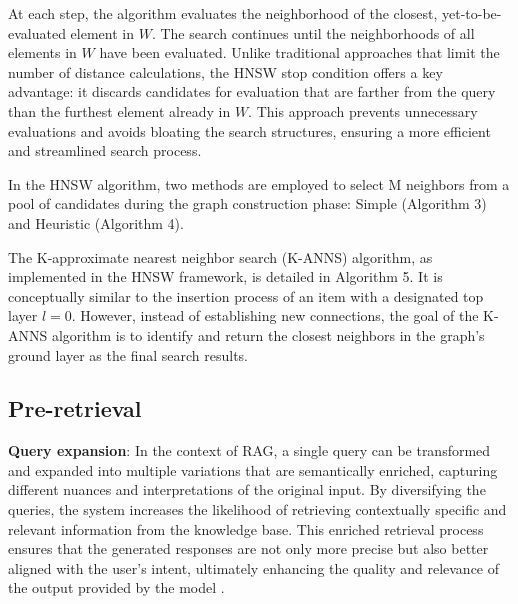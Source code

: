 At each step, the algorithm evaluates the neighborhood of the closest, yet-to-be-evaluated element in $W$. The search continues until the neighborhoods of all elements in $W$ have been evaluated. Unlike traditional approaches that limit the number of distance calculations, the HNSW stop condition offers a key advantage: it discards candidates for evaluation that are farther from the query than the furthest element already in $W$. This approach prevents unnecessary evaluations and avoids bloating the search structures, ensuring a more efficient and streamlined search process.

In the HNSW algorithm, two methods are employed to select M neighbors from a pool of candidates during the graph construction phase: Simple (Algorithm 3) and Heuristic (Algorithm 4).




The K-approximate nearest neighbor search (K-ANNS) algorithm, as implemented in the HNSW framework, is detailed in Algorithm 5. It is conceptually similar to the insertion process of an item with a designated top layer $l=0$. However, instead of establishing new connections, the goal of the K-ANNS algorithm is to identify and return the closest neighbors in the graph's ground layer as the final search results.



\subsection{Pre-retrieval}

\textbf{Query expansion}: In the context of RAG, a single query can be transformed and expanded into multiple variations that are semantically enriched, capturing different nuances and interpretations of the original input. By diversifying the queries, the system increases the likelihood of retrieving contextually specific and relevant information from the knowledge base. This enriched retrieval process ensures that the generated responses are not only more precise but also better aligned with the user's intent, ultimately enhancing the quality and relevance of the output provided by the model \cite{gao2023ragllmsurvey}.

